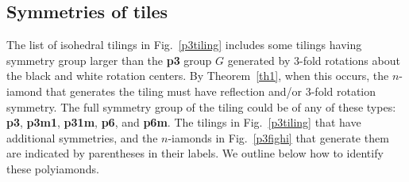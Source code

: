 \documentclass{ws-ijcga}
\begin{document}
\subsection{Symmetries of tiles}
\label{p3:sym}
The list of isohedral tilings in Fig.~\ref{p3tiling} includes some tilings having symmetry group larger than
the {\bf p3} group $G$ generated by 3-fold rotations about the black and white rotation centers. 
By Theorem~\ref{th1}, when this occurs, the $n$-iamond that generates the tiling must have reflection and/or
3-fold rotation symmetry. 
The full symmetry group of the tiling could be of any of these types:
{\bf p3}, {\bf p3m1}, {\bf p31m}, {\bf p6}, and {\bf p6m}. 
The tilings in Fig.~\ref{p3tiling} that have additional symmetries, and the
$n$-iamonds in Fig.~\ref{p3fighi} that generate them are indicated by parentheses in their labels. 
We outline below how to identify these polyiamonds.
\end{document}
